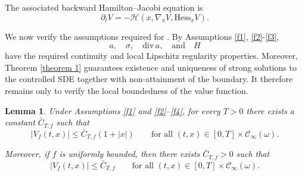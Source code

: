 \documentclass[11pt]{article}
\newtheorem{lemma}[theorem]{Lemma}
\theoremstyle{rem}
\begin{document}
The associated backward Hamilton--Jacobi equation is
\begin{equation}\label{backward}
\partial_tV
=
-\mathcal H(
x,
\nabla_xV,
\mathrm{Hess}_xV
).
\end{equation}

We now verify the assumptions required for \cite[Theorem 7.4]{T13}. By Assumptions \ref{f1}, \ref{f2}-\ref{f3},
\[
a,\quad
\sigma,\quad
\mathrm{div}\,a,
\quad\text{and}\quad
H
\]
have the required continuity and local Lipschitz regularity properties. Moreover, Theorem \ref{theorem 1} guarantees existence and uniqueness of strong solutions to the controlled SDE together with non-attainment of the boundary. It therefore remains only to verify the local boundedness of the value function.

\begin{lemma}\label{le:V.local.bdd}
Under Assumptions \ref{f1} and \ref{f2}--\ref{f4}, for every $T>0$ there exists a constant $\bar C_{T,f}$ such that
\begin{equation}\label{eq:V-locally-bounded}
|V_f(t,x)|
\leq
\bar C_{T,f}(1+|x|)
\qquad
\text{for all }
(t,x)\in[0,T]\times\mathcal C_\infty(\omega).
\end{equation}

Moreover, if $f$ is uniformly bounded, then there exists
$\bar C_{T,f}>0$ such that
\begin{equation}\label{eq:V-unif-bound}
|V_f(t,x)|
\leq
\bar C_{T,f}
\qquad
\text{for all }
(t,x)\in[0,T]\times\mathcal C_\infty(\omega).
\end{equation}
\end{lemma}
\end{document}
